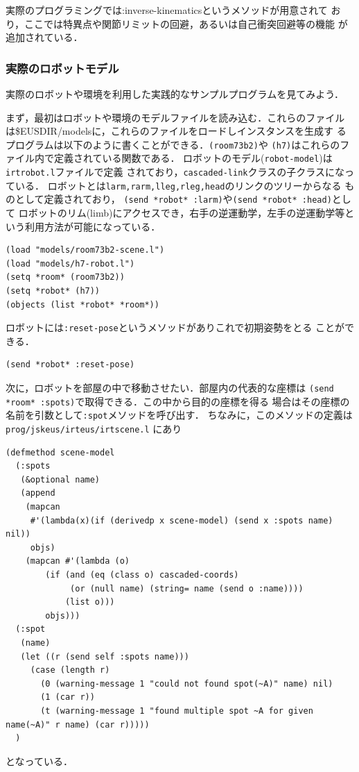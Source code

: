 実際のプログラミングでは:inverse-kinematicsというメソッドが用意されて
おり，ここでは特異点や関節リミットの回避，あるいは自己衝突回避等の機能
が追加されている．

\subsubsection{実際のロボットモデル}

実際のロボットや環境を利用した実践的なサンプルプログラムを見てみよう．

まず，最初はロボットや環境のモデルファイルを読み込む．これらのファイル
は\${EUSDIR}/modelsに，これらのファイルをロードしインスタンスを生成す
るプログラムは以下のように書くことができる．\verb|(room73b2)|や
\verb|(h7)|はこれらのファイル内で定義されている関数である．
ロボットのモデル(\verb|robot-model|)は\verb|irtrobot.l|ファイルで定義
されており，\verb|cascaded-link|クラスの子クラスになっている．
ロボットとは\verb|larm,rarm,lleg,rleg,head|のリンクのツリーからなる
ものとして定義されており，
\verb|(send *robot* :larm)|や\verb|(send *robot* :head)|として
ロボットのリム(limb)にアクセスでき，右手の逆運動学，左手の逆運動学等と
いう利用方法が可能になっている．

{\baselineskip=10pt
\begin{verbatim}
(load "models/room73b2-scene.l")
(load "models/h7-robot.l")
(setq *room* (room73b2))
(setq *robot* (h7))
(objects (list *robot* *room*))
\end{verbatim}
}

ロボットには\verb|:reset-pose|というメソッドがありこれで初期姿勢をとる
ことができる．
{\baselineskip=10pt
\begin{verbatim}
(send *robot* :reset-pose)
\end{verbatim}
}

次に，ロボットを部屋の中で移動させたい．部屋内の代表的な座標は
\verb|(send *room* :spots)|で取得できる．この中から目的の座標を得る
場合はその座標の名前を引数として\verb|:spot|メソッドを呼び出す．
ちなみに，このメソッドの定義は\verb|prog/jskeus/irteus/irtscene.l|
にあり
{\baselineskip=10pt
\begin{verbatim}
(defmethod scene-model
  (:spots
   (&optional name)
   (append
    (mapcan
     #'(lambda(x)(if (derivedp x scene-model) (send x :spots name) nil))
     objs)
    (mapcan #'(lambda (o)
		(if (and (eq (class o) cascaded-coords)
			 (or (null name) (string= name (send o :name))))
		    (list o)))
	    objs)))
  (:spot
   (name)
   (let ((r (send self :spots name)))
     (case (length r)
       (0 (warning-message 1 "could not found spot(~A)" name) nil)
       (1 (car r))
       (t (warning-message 1 "found multiple spot ~A for given name(~A)" r name) (car r)))))
  )
\end{verbatim}
}
となっている．

